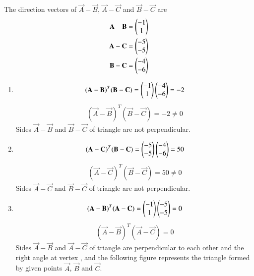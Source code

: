 The direction vectors of $\vec{A}-\vec{B}$, $\vec{A}-\vec{C}$ and $\vec{B}-\vec{C}$ are
\begin{align}
	\mathbf{A}-\mathbf{B} =\begin{pmatrix}-1 \\ 1\end{pmatrix} \\
	\mathbf{A}-\mathbf{C} =\begin{pmatrix}-5 \\ -5\end{pmatrix}\\
	\mathbf{B}-\mathbf{C} =\begin{pmatrix}-4 \\ -6\end{pmatrix} 
\end{align}
\begin{enumerate}
\item \begin{align} {(\mathbf{A}-\mathbf{B})}^T  (\mathbf{B}-\mathbf{C})  =   \begin{pmatrix} -1 \\ 1 \end{pmatrix}  \begin{pmatrix} -4 \\ -6 \end{pmatrix} = -2 \end{align}
\begin{align}{(\vec{A}-\vec{B})}^T  (\vec{B}-\vec{C}) = -2 \neq 0 \end{align}
Sides $\vec{A}-\vec{B}$ and $\vec{B}-\vec{C}$ of triangle are not perpendicular.

\item \begin{align}{(\mathbf{A}-\mathbf{C})}^T  (\mathbf{B}-\mathbf{C}) =  \begin{pmatrix} -5 \\ -5 \end{pmatrix}  \begin{pmatrix} -4 \\ -6 \end{pmatrix} = 50\end{align}
\begin {align}{(\vec{A}-\vec{C})}^T  (\vec{B}-\vec{C}) = 50 \neq 0 \end {align}
Sides $\vec{A}-\vec{C}$ and $\vec{B}-\vec{C}$ of triangle are not perpendicular.

\item \begin{align}{(\mathbf{A}-\mathbf{B})}^T  (\mathbf{A}-\mathbf{C}) =  \begin{pmatrix} -1 \\ 1 \end{pmatrix}  \begin{pmatrix} -5 \\ -5 \end{pmatrix} = 0\end{align}
\begin {align}{(\vec{A}-\vec{B})}^T  (\vec{A}-\vec{C}) = 0  \end {align}
Sides $\vec{A}-\vec{B}$ and  $\vec{A}-\vec{C}$  of triangle are perpendicular to each other and the right angle at vertex , and the following figure represents the triangle formed by given points $\vec{A}$, $\vec{B}$ and $\vec{C}$.  
\end{enumerate}
